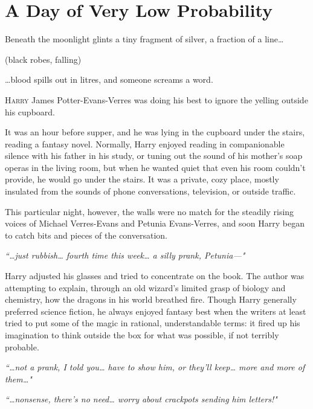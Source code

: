 \chapter{A Day of Very Low Probability}

\begin{chapterOpeningQuote}
\noindent
Beneath the moonlight glints a tiny fragment of silver, a fraction of a line{\ldots}

\vspace*{2ex}
(black robes, falling)

\vspace*{2ex}
{\ldots}blood spills out in litres, and someone screams a word.
\end{chapterOpeningQuote}

\lettrine{H}{arry} James Potter-Evans-Verres was doing his best to
ignore the yelling outside his cupboard.

It was an hour before supper, and he was lying in the
cupboard under the stairs, reading a fantasy novel.
Normally, Harry enjoyed reading in companionable silence with
his father in his study, or tuning out the sound of his
mother's soap operas in the living room, but when he
wanted quiet that even his room couldn't provide, he
would go under the stairs. It was a private, cozy place,
mostly insulated from the sounds of phone conversations,
television, or outside traffic.

This particular night, however, the walls were no match for
the steadily rising voices of Michael Verres-Evans and Petunia
Evans-Verres, and soon Harry began to catch bits and
pieces of the conversation.

\emph{``{\ldots}just rubbish{\ldots} fourth time this week{\ldots} a silly prank,
Petunia---"}

Harry adjusted his glasses and tried to concentrate on the
book. The author was attempting to explain, through an
old wizard's limited grasp of biology and chemistry, how
the dragons in his world breathed fire. Though Harry
generally preferred science fiction, he always enjoyed
fantasy best when the writers at least tried to put some
of the magic in rational, understandable terms: it fired up
his imagination to think outside the box for what was
possible, if not terribly probable.

\emph{``{\ldots}not a prank, I told you{\ldots} have to show him, or they'll
keep{\ldots} more and more of them{\ldots}"}

\emph{``{\ldots}nonsense, there's no need{\ldots} worry about crackpots
sending him letters!"}


